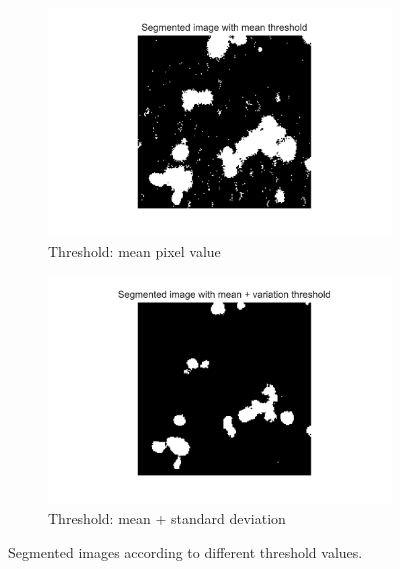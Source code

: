 \begin{figure}[h]
    \centering
    \begin{subfigure}[h!]{0.4\textwidth}
        \includegraphics[width=\textwidth]{dissertation/figures/mean_threshold_cell.jpg}
        \caption{Threshold: mean pixel value}
        \label{fig:thresholdmean}
    \end{subfigure}
    \begin{subfigure}[h!]{0.4\textwidth}
        \includegraphics[width=\textwidth]{dissertation/figures/mean_std_threshold_cell.jpg}
        \caption{Threshold: mean + standard deviation}
        \label{fig:thresholdstd}
    \end{subfigure}
    \caption{Segmented images according to different threshold values.}
\end{figure}


